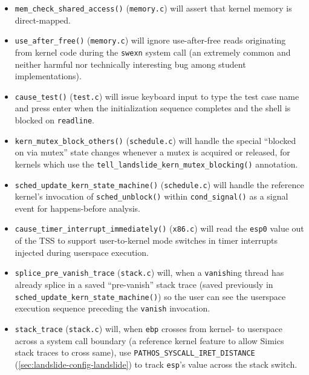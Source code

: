 \begin{itemize}
	\item {\tt mem\_check\_shared\_access()} ({\tt memory.c})
		will assert that kernel memory is direct-mapped.
	\item {\tt use\_after\_free()} ({\tt memory.c})
		will ignore use-after-free reads originating from kernel code during the {\tt swexn} system call
		(an extremely common and neither harmful nor technically interesting bug among student implementations).
	\item {\tt cause\_test()} ({\tt test.c})
		will issue keyboard input to type the test case name and press enter
		when the initialization sequence completes and the shell is blocked on {\tt readline}.
	\item {\tt kern\_mutex\_block\_others()} ({\tt schedule.c})
		will handle the special ``blocked on via mutex'' state changes
		whenever a mutex is acquired or released,
		for kernels which use the {\tt tell\_landslide\_kern\_mutex\_blocking()} annotation.
	\item {\tt sched\_update\_kern\_state\_machine()} ({\tt schedule.c})
		will handle the reference kernel's invocation of {\tt sched\_unblock()} within {\tt cond\_\allowbreak{}signal()}
		as a signal event for happens-before analysis.
	\item {\tt cause\_timer\_interrupt\_immediately()} ({\tt x86.c})
		will read the {\tt esp0} value out of the TSS to support user-to-kernel mode switches
		in timer interrupts injected during userspace execution.
	\item {\tt splice\_pre\_vanish\_trace} ({\tt stack.c})
		will, when a {\tt vanish}ing thread has already
		splice in a saved ``pre-vanish'' stack trace
		(saved previously in {\tt sched\_update\_kern\_state\_machine()})
		so the user can see the userspace execution sequence preceding the {\tt vanish} invocation.
	\item {\tt stack\_trace} ({\tt stack.c})
		will, when {\tt ebp} crosses from kernel- to userspace across a system call boundary
		(a reference kernel feature to allow Simics stack traces to cross same),
		use {\tt PATHOS\_SYSCALL\_IRET\_DISTANCE} (\cref{sec:landslide-config-landslide})
		to track {\tt esp}'s value across the stack switch.
\end{itemize}


